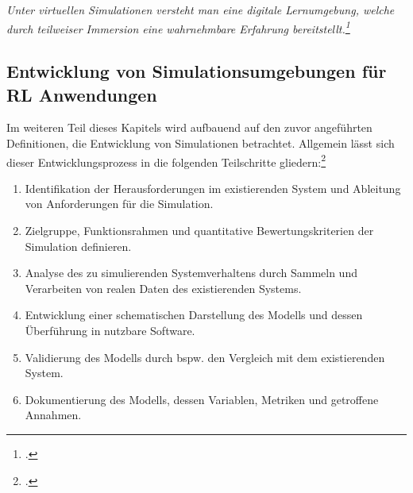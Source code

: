 \textit{Unter virtuellen Simulationen versteht man eine digitale Lernumgebung, welche durch teilweiser Immersion eine wahrnehmbare Erfahrung bereitstellt.\footcite[Vgl.][S. 1]{Foronda.2021}}

\subsection{Entwicklung von Simulationsumgebungen für RL Anwendungen}
Im weiteren Teil dieses Kapitels wird aufbauend auf den zuvor angeführten Definitionen, die Entwicklung von Simulationen betrachtet.
Allgemein lässt sich dieser Entwicklungsprozess in die folgenden Teilschritte gliedern:\footcite[Vgl.][S. 8f.]{Maria.1997}
\begin{enumerate}
    \item Identifikation der Herausforderungen im existierenden System und Ableitung von Anforderungen für die Simulation.
    \item Zielgruppe, Funktionsrahmen und quantitative Bewertungskriterien der Simulation definieren.
    \item Analyse des zu simulierenden Systemverhaltens durch Sammeln und Verarbeiten von realen Daten des existierenden Systems.
    \item Entwicklung einer schematischen Darstellung des Modells und dessen Überführung in nutzbare Software.
    \item Validierung des Modells durch bspw. den Vergleich mit dem existierenden System.
    \item Dokumentierung des Modells, dessen Variablen, Metriken und getroffene Annahmen.
\end{enumerate}

